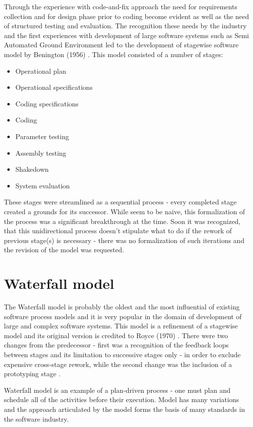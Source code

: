 Through the experience with code-and-fix approach the need for requirements collection and 
for design phase prior to coding become evident as well as the need of structured 
testing and evaluation. The recognition these needs by the industry and the first experiences
with development of large software systems such as Semi Automated Ground 
Environment \cite{citeulike:10004001} \cite{citeulike:10004037} led to the development 
of stagewise software model by Benington (1956) \cite{citeulike:10004032}. 
This model consisted of a number of stages:
\begin{itemize}
 \item Operational plan
 \item Operational specifications
 \item Coding specifications
 \item Coding
 \item Parameter testing
 \item Assembly testing
 \item Shakedown
 \item System evaluation
\end{itemize}
These stages were streamlined as a sequential process - every completed stage created a
grounds for its successor. While seem to be naive, this formalization of the process was a 
significant breakthrough at the time. Soon it was recognized, that this unidirectional process
doesn't stipulate what to do if the rework of previous stage(s) is necessary - there was 
no formalization of such iterations and the revision of the model was requested.

\section{Waterfall model}
The Waterfall model is probably the oldest and the most influential of existing software 
process models and it is very popular in the domain of development of large and 
complex software systems. 
This model is a refinement of a stagewise model and its 
original version is credited to Royce (1970) \cite{citeulike:9982731}. There were two 
changes from the predecessor - first was a recognition of the feedback loops between 
stages and its limitation to successive stages only - in order to exclude expensive
cross-stage rework, while the second change was the inclusion of a prototyping stage
\cite{Boehm95anchoringthe}.

Waterfall model is an example of a plan-driven process - one must plan and schedule all 
of the activities before their execution. Model has many variations and the approach 
articulated by the model forms the basis of many standards in the software industry.


